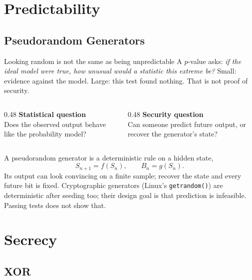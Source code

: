 \documentclass[11pt,aspectratio=169]{beamer}
\begin{document}
\section{Predictability}
\subsection{Pseudorandom Generators}

\begin{frame}{Looking random is not the same as being unpredictable}
  A $p$-value asks: \emph{if the ideal model were true, how unusual would a
  statistic this extreme be?} Small: evidence against the model.
  Large: this test found nothing. That is not proof of security.
  \medskip
  \begin{columns}[T]
    \begin{column}{0.48\textwidth}
      \textbf{\color{deep}Statistical question}\\
      Does the observed output behave like the probability model?
    \end{column}
    \begin{column}{0.48\textwidth}
      \textbf{\color{deep}Security question}\\
      Can someone predict future output, or recover the generator's state?
    \end{column}
  \end{columns}
  \medskip
  A pseudorandom generator is a deterministic rule on a hidden state,
  \[S_{n+1}=f(S_n),\qquad B_n=g(S_n).\]
  Its output can look convincing on a finite sample; recover the state and
  every future bit is fixed. Cryptographic generators (Linux's
  \texttt{getrandom()}) are deterministic after seeding too; their design
  goal is that prediction is infeasible. Passing tests does not show that.
\end{frame}

\section{Secrecy}
\subsection{XOR}
\end{document}
